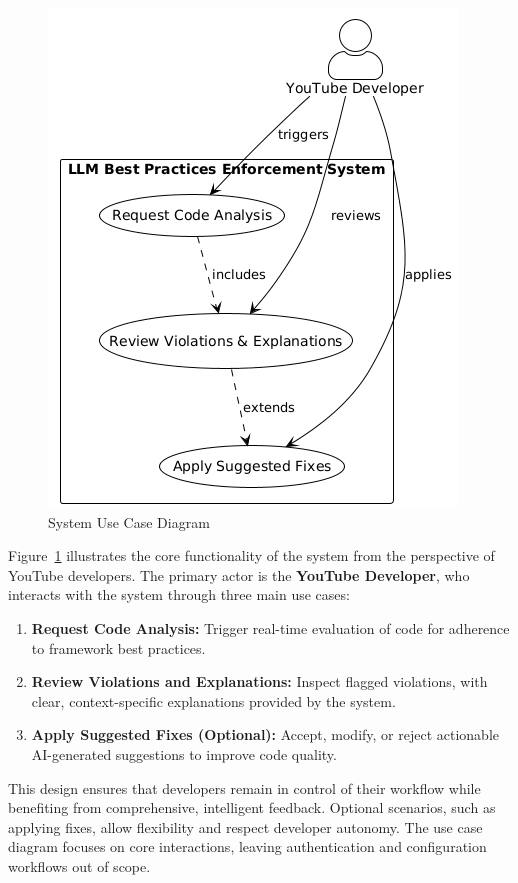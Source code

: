 \begin{spacing}{1.2}
\begin{figure}[H]
    \centering
    \includegraphics[scale=0.6]{images/use_case_diagram.png}
    \caption{System Use Case Diagram}
    \label{fig:use_case_diagram}
    \end{figure}

Figure~\ref{fig:use_case_diagram} illustrates the core functionality of the system from the perspective of YouTube developers. The primary actor is the \textbf{YouTube Developer}, who interacts with the system through three main use cases:

\begin{enumerate}
\item \textbf{Request Code Analysis:} Trigger real-time evaluation of code for adherence to framework best practices.
\item \textbf{Review Violations and Explanations:} Inspect flagged violations, with clear, context-specific explanations provided by the system.
\item \textbf{Apply Suggested Fixes (Optional):} Accept, modify, or reject actionable AI-generated suggestions to improve code quality.
\end{enumerate}

This design ensures that developers remain in control of their workflow while benefiting from comprehensive, intelligent feedback. Optional scenarios, such as applying fixes, allow flexibility and respect developer autonomy. The use case diagram focuses on core interactions, leaving authentication and configuration workflows out of scope.


\end{spacing}
